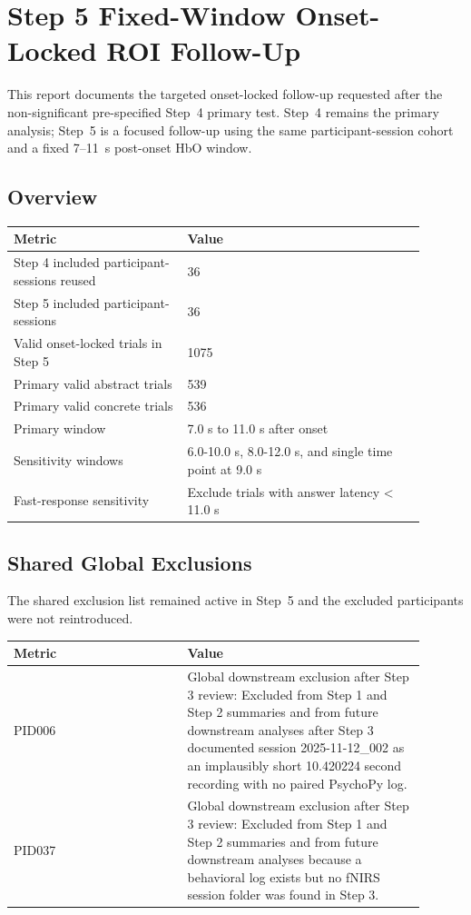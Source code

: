 \documentclass[11pt]{article}
\begin{document}
\section*{Step 5 Fixed-Window Onset-Locked ROI Follow-Up}
This report documents the targeted onset-locked follow-up requested after the non-significant pre-specified Step~4 primary test. Step~4 remains the primary analysis; Step~5 is a focused follow-up using the same participant-session cohort and a fixed 7--11~s post-onset HbO window.
\subsection*{Overview}
\begin{tabular}{p{0.38\linewidth}p{0.52\linewidth}}
\toprule
Metric & Value\\
\midrule
Step 4 included participant-sessions reused & 36\\
Step 5 included participant-sessions & 36\\
Valid onset-locked trials in Step 5 & 1075\\
Primary valid abstract trials & 539\\
Primary valid concrete trials & 536\\
Primary window & 7.0 s to 11.0 s after onset\\
Sensitivity windows & 6.0-10.0 s, 8.0-12.0 s, and single time point at 9.0 s\\
Fast-response sensitivity & Exclude trials with answer latency < 11.0 s\\
\bottomrule
\end{tabular}
\subsection*{Shared Global Exclusions}
The shared exclusion list remained active in Step~5 and the excluded participants were not reintroduced.
\begin{tabular}{p{0.38\linewidth}p{0.52\linewidth}}
\toprule
Metric & Value\\
\midrule
PID006 & Global downstream exclusion after Step 3 review: Excluded from Step 1 and Step 2 summaries and from future downstream analyses after Step 3 documented session 2025-11-12\_002 as an implausibly short 10.420224 second recording with no paired PsychoPy log.\\
PID037 & Global downstream exclusion after Step 3 review: Excluded from Step 1 and Step 2 summaries and from future downstream analyses because a behavioral log exists but no fNIRS session folder was found in Step 3.\\
\bottomrule
\end{tabular}
\end{document}
